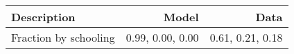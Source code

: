 \begin{tabular}{lrr}
\hline
Description & Model  & Data  \\
\hline
Fraction by schooling & 0.99, 0.00, 0.00  & 0.61, 0.21, 0.18  \\
\hline
\end{tabular}%
